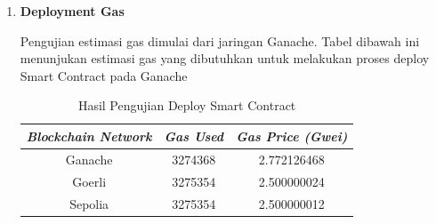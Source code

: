 \begin{enumerate}
  \item
        \textbf{Deployment Gas}

        Pengujian estimasi gas dimulai dari jaringan Ganache. Tabel dibawah ini menunjukan estimasi gas yang dibutuhkan untuk melakukan proses deploy Smart Contract pada Ganache

        \begin{longtable}{|c|c|c|}
          \caption{Hasil Pengujian Deploy Smart Contract}
          \label{tb:UjiDeploy}                                                                             \\
          \hline
          \rowcolor[HTML]{C0C0C0}
          \textbf{\emph{Blockchain Network}} & \textbf{\emph{Gas Used}} & \textbf{\emph{Gas Price (Gwei)}} \\
          \hline
          Ganache                            & 3274368                  & 2.772126468                      \\
          Goerli                             & 3275354                  & 2.500000024                      \\
          Sepolia                            & 3275354                  & 2.500000012                      \\
          \hline
        \end{longtable}


\end{enumerate}
